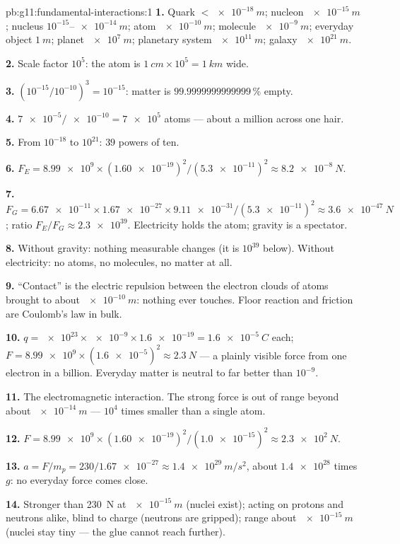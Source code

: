 \begin{solution}{pb:g11:fundamental-interactions:1}
\textbf{1.} Quark $< \qty{e-18}{m}$; nucleon $\qty{e-15}{m}$; nucleus
$10^{-15}$--$\qty{e-14}{m}$; atom $\qty{e-10}{m}$; molecule
$\qty{e-9}{m}$; everyday object $\qty{1}{m}$; planet $\qty{e7}{m}$;
planetary system $\qty{e11}{m}$; galaxy $\qty{e21}{m}$.

\textbf{2.} Scale factor $10^{5}$: the atom is
$\qty{1}{cm} \times 10^{5} = \qty{1}{km}$ wide.

\textbf{3.} $(10^{-15}/10^{-10})^3 = 10^{-15}$: matter is
$\num{99.9999999999999}\,\%$ empty.

\textbf{4.} $\num{7e-5}/\num{e-10} = \num{7e5}$ atoms --- about a
million across one hair.

\textbf{5.} From $10^{-18}$ to $10^{21}$: $39$ powers of ten.

\textbf{6.} $F_E = \num{8.99e9} \times (\num{1.60e-19})^2 /
(\num{5.3e-11})^2 \approx \qty{8.2e-8}{N}$.

\textbf{7.} $F_G = \num{6.67e-11} \times \num{1.67e-27} \times
\num{9.11e-31}/(\num{5.3e-11})^2 \approx \qty{3.6e-47}{N}$; ratio
$F_E/F_G \approx \num{2.3e39}$. Electricity holds the atom; gravity is
a spectator.

\textbf{8.} Without gravity: nothing measurable changes (it is $10^{39}$
below). Without electricity: no atoms, no molecules, no matter at all.

\textbf{9.} ``Contact'' is the electric repulsion between the electron
clouds of atoms brought to about $\qty{e-10}{m}$: nothing ever touches.
Floor reaction and friction are Coulomb's law in bulk.

\textbf{10.} $q = \num{e23} \times \num{e-9} \times \num{1.6e-19} =
\qty{1.6e-5}{C}$ each;
$F = \num{8.99e9} \times (\num{1.6e-5})^2 \approx \qty{2.3}{N}$ --- a
plainly visible force from one electron in a billion. Everyday matter
is neutral to far better than $10^{-9}$.

\textbf{11.} The electromagnetic interaction. The strong force is out
of range beyond about $\qty{e-14}{m}$ --- $10^{4}$ times smaller than a
single atom.

\textbf{12.} $F = \num{8.99e9} \times (\num{1.60e-19})^2 /
(\num{1.0e-15})^2 \approx \qty{2.3e2}{N}$.

\textbf{13.} $a = F/m_p = 230/\num{1.67e-27} \approx
\qty{1.4e29}{m/s^2}$, about $\num{1.4e28}$ times $g$: no everyday force
comes close.

\textbf{14.} Stronger than \qty{230}{N} at $\qty{e-15}{m}$ (nuclei
exist); acting on protons and neutrons alike, blind to charge (neutrons
are gripped); range about $\qty{e-15}{m}$ (nuclei stay tiny --- the
glue cannot reach further).


\end{solution}
